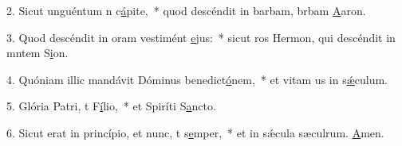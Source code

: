 2. Sicut unguéntum n c\uline{á}pite,~* quod descéndit in barbam, brbam \uline{A}aron.\par 
3. Quod descéndit in oram vestimént \uline{e}jus:~* sicut ros Hermon, qui descéndit in mntem S\uline{i}on.\par 
4. Quóniam illic mandávit Dóminus benedict\uline{ó}nem,~* et vitam us in s\uline{ǽ}culum.\par 
5. Glória Patri, t F\uline{í}lio,~* et Spiríti S\uline{a}ncto.\par 
6. Sicut erat in princípio, et nunc, t s\uline{e}mper,~* et in sǽcula sæculrum. \uline{A}men.\par 
